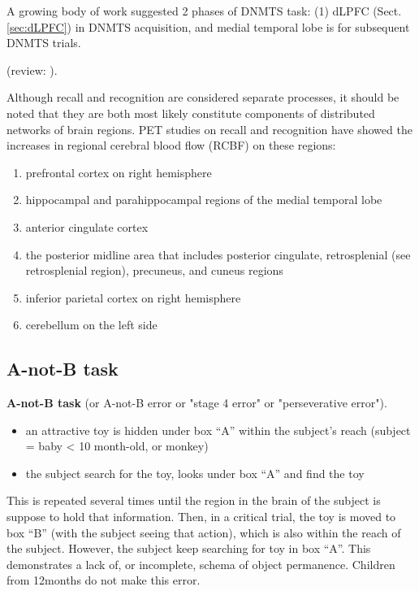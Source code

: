 \begin{itemize}
  A growing body of work suggested 2 phases of DNMTS task: (1) dLPFC
  (Sect.\ref{sec:dLPFC}) in DNMTS acquisition, and medial temporal lobe is for
  subsequent DNMTS trials.
   
\end{itemize}
(review: \citep{antunes2012}).

Although recall and recognition are considered separate processes, it should be
noted that they are both most likely constitute components of distributed
networks of brain regions.
PET studies on recall and recognition have showed the increases in
regional cerebral blood flow (RCBF) on these regions:
\begin{enumerate}
  \item prefrontal cortex on right hemisphere
  \item hippocampal and parahippocampal regions of the medial temporal lobe
  \item anterior cingulate cortex
  \item the posterior midline area that includes posterior cingulate,
  retrosplenial (see retrosplenial region), precuneus, and cuneus regions
  \item inferior parietal cortex on right hemisphere
  \item cerebellum on the left side
\end{enumerate}

\subsection{A-not-B task}
\label{sec:A-not-B task}

{\bf A-not-B task} (or A-not-B error or "stage 4 error" or "perseverative
error").

\begin{itemize}
  \item an attractive toy is hidden under box ``A'' within the subject's reach
  (subject = baby < 10 month-old, or monkey)
  
  \item the subject search for the toy, looks under box ``A'' and find the toy
\end{itemize}
This is repeated several times until the region in the brain of the subject is
suppose to hold that information. Then, in a critical trial, the toy is moved to
box ``B'' (with the subject seeing that action), which is also within the reach
of the subject. However, the subject keep searching for toy in box ``A''.
This demonstrates a lack of, or incomplete, schema of object permanence. 
Children from 12months do not make this error.
	
